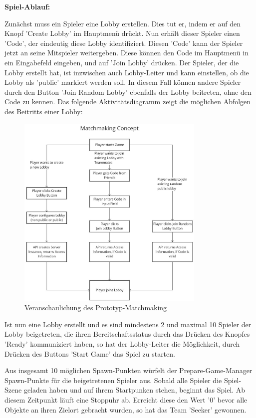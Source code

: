 \textbf{Spiel-Ablauf:}

Zunächst muss ein Spieler eine Lobby erstellen. Dies tut er, indem er auf den Knopf 'Create Lobby' im Hauptmenü drückt. Nun erhält dieser Spieler einen 'Code', der eindeutig diese Lobby identifiziert. Diesen 'Code' kann der Spieler jetzt an seine Mitspieler weitergeben. Diese können den Code im Hauptmenü in ein Eingabefeld eingeben, und auf 'Join Lobby' drücken. Der Spieler, der die Lobby erstellt hat, ist inzwischen auch Lobby-Leiter und kann einstellen, ob die Lobby als 'public' markiert werden soll. In diesem Fall können andere Spieler durch den Button 'Join Random Lobby' ebenfalls der Lobby beitreten, ohne den Code zu kennen. Das folgende Aktivitätsdiagramm zeigt die möglichen Abfolgen des Beitritts einer Lobby:

\begin{figure}[H]
	\centering
	\includegraphics[width=90mm]{images/matchmaking_concept.jpg}
	\caption[Matchmaking-Konzept Diagramm]{Veranschaulichung des Prototyp-Matchmaking}
	\label{pic:matchmaking_concept}
\end{figure}

Ist nun eine Lobby erstellt und es sind mindestens 2 und maximal 10 Spieler der Lobby beigetreten, die ihren Bereitschaftsstatus durch das Drücken des Knopfes 'Ready' kommuniziert haben, so hat der Lobby-Leiter die Möglichkeit, durch Drücken des Buttons 'Start Game' das Spiel zu starten.

Aus insgesamt 10 möglichen Spawn-Punkten würfelt der Prepare-Game-Manager Spawn-Punkte für die beigetretenen Spieler aus. Sobald alle Spieler die Spiel-Szene geladen haben und auf ihrem Startpunken stehen, beginnt das Spiel. Ab diesem Zeitpunkt läuft eine Stoppuhr ab. Erreicht diese den Wert '0' bevor alle Objekte an ihren Zielort gebracht wurden, so hat das Team 'Seeker' gewonnen.

